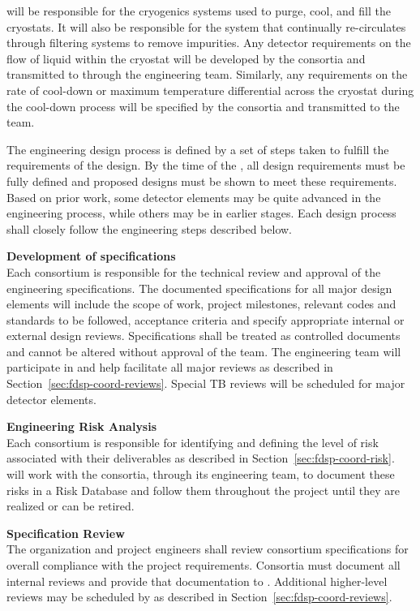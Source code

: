  will be responsible for the cryogenics systems used to purge,
cool, and fill the cryostats.  It will also be responsible for the
system that continually re-circulates \lar through filtering
systems to remove impurities.  Any detector requirements on the flow
of liquid within the cryostat %
will be developed by the consortia and
transmitted to  through the  engineering team.  Similarly,
any requirements on the rate of cool-down or maximum temperature
differential across the cryostat during the cool-down process will %
be specified by the consortia and transmitted to the  team.

The engineering design process is defined by a set of steps taken to
fulfill the requirements of the design.  By the time of the , 
all design requirements must be fully defined and
proposed designs must be shown to meet these requirements.  Based on
prior work, some detector elements may be quite advanced in the
engineering process, while others may be in earlier stages.  Each
design process shall closely follow the engineering steps described
below.


{\bf Development of specifications}\\ Each consortium is responsible
for the technical review and approval of the engineering
specifications.  The documented specifications for all major design
elements will %
include the scope of work, project milestones,
relevant codes and standards to be followed, acceptance criteria and
specify appropriate internal or external design reviews.
Specifications shall be treated as controlled documents and cannot be
altered without approval of the 
team.  The  engineering team will participate in and help facilitate
all major reviews as described in
Section~\ref{sec:fdsp-coord-reviews}.  Special TB reviews
will be scheduled for major detector elements.

{\bf Engineering Risk Analysis}\\ Each consortium is responsible for
identifying and defining the level of risk associated with their
deliverables as described in Section~\ref{sec:fdsp-coord-risk}.
 will work with the consortia,
through its  engineering team, to document these risks in a Risk
Database and follow them throughout the project until they are
realized or can be retired.

{\bf Specification Review}\\
The   organization and project engineers
shall review consortium specifications for overall compliance with the
project requirements.  Consortia must document all internal reviews
and provide that documentation to .
Additional higher-level reviews may be scheduled by 
as described in Section~\ref{sec:fdsp-coord-reviews}.

